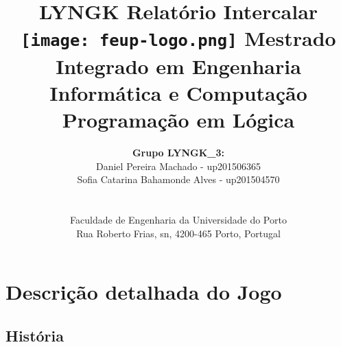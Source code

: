 \documentclass[a4paper]{article}
\begin{document}
\setlength{\textwidth}{16cm}
\setlength{\textheight}{22cm}


\title{\Huge\textbf{LYNGK}\linebreak\linebreak\linebreak
\Large\textbf{Relatório Intercalar}\linebreak\linebreak
\linebreak\linebreak
\texttt{[image: feup-logo.png]}\linebreak\linebreak
\linebreak\linebreak
\Large{Mestrado Integrado em Engenharia Informática e Computação} \linebreak\linebreak
\Large{Programação em Lógica}\linebreak
		}

\author{
\textbf{Grupo LYNGK\_3:}\\
	Daniel Pereira Machado - up201506365 \\
	Sofia Catarina Bahamonde Alves - up201504570 \\
\linebreak\linebreak \\
 \\ Faculdade de Engenharia da Universidade do Porto \\ Rua Roberto Frias, s\/n, 4200-465 Porto, Portugal \linebreak\linebreak\linebreak
\linebreak\linebreak\vspace{1cm}}

\maketitle
\thispagestyle{empty}

\newpage

\section{Descrição detalhada do Jogo}
\subsection{História}
\end{document}
